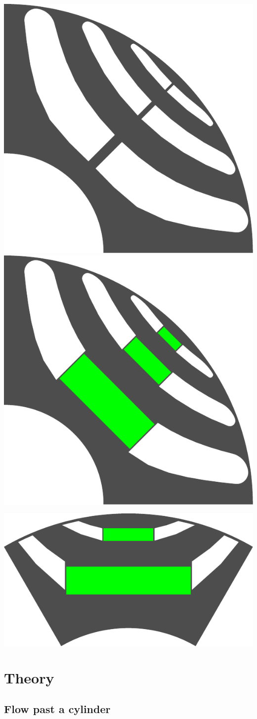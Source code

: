 \documentclass[b5paper,11pt,oneside,fleqn]{article}
\begin{document}
\includegraphics[width=0.5\linewidth]{ex1}
\includegraphics[width=0.5\linewidth]{ex2}
\vspace{\baselineskip}

\includegraphics[width=0.75\linewidth]{ex3}




\clearpage
\section{Theory}

\subsection{Flow past a cylinder}
\end{document}
